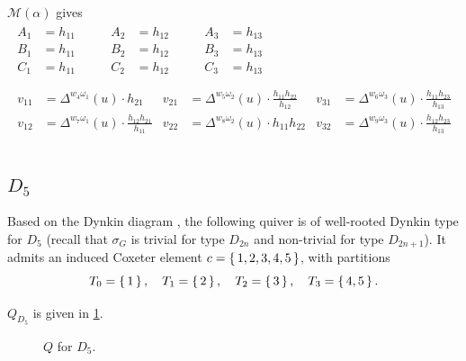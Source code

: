 \documentclass{amsart}
\theoremstyle{plain}
\theoremstyle{definition}
\theoremstyle{remark}
\newcommand{\conftoquiv}{\mathcal{M}}
\newcommand{\fundamentalweight}{\omega}
\newcommand{\genminor}[2]{\Delta^{{#1} \fundamentalweight_{#2}}}
\newcommand{\inldynkinDfive}{\raisebox{-0.7ex}{}}
\begin{document}
  $\conftoquiv(\alpha)$ gives
  \begin{equation*}
    \begin{gathered}
      \begin{aligned}
        A_1 &= h_{11} &\qquad A_2 &= h_{12} &\qquad A_3 &= h_{13} \\
        B_1 &= h_{11} &\qquad B_2 &= h_{12} &\qquad B_3 &= h_{13} \\
        C_1 &= h_{11} &\qquad C_2 &= h_{12} &\qquad C_3 &= h_{13} \\
      \end{aligned}
      \\
      \begin{aligned}
        v_{1 1} &= \genminor{w_{4}}{1}(u) \cdot h_{21} & v_{2 1} &= \genminor{w_{5}}{2}(u) \cdot \frac{h_{11} h_{22} }{h_{12}} & v_{3 1} &= \genminor{w_{6}}{3}(u) \cdot \frac{h_{11} h_{23} }{h_{13}} \\
        v_{1 2} &= \genminor{w_{7}}{1}(u) \cdot \frac{h_{12} h_{21} }{h_{11}} & v_{2 2} &= \genminor{w_{8}}{2}(u) \cdot h_{11} h_{22} & v_{3 2} &= \genminor{w_{9}}{3}(u) \cdot \frac{h_{12} h_{23} }{h_{13}} \\
      \end{aligned}
    \end{gathered}
  \end{equation*}

  \subsection{\texorpdfstring{$D_5$}{D\_5}}

  Based on the Dynkin diagram \inldynkinDfive, the following quiver is
  of well-rooted Dynkin type for $D_5$ (recall that $\sigma_G$ is
  trivial for type $D_{2n}$ and non-trivial for type $D_{2n+1}$). It
  admits an induced Coxeter element $c = \set{1, 2, 3, 4, 5}$, with
  partitions \[ T_0 = \set{1}, \quad T_1 = \set{2}, \quad T_2 = \set{3},
    \quad T_3 = \set{4, 5}. \]

  {\centering 

  } $Q_{D_5}$ is given in \cref{fig:QD5}.

  \begin{figure}
    \centering 

    \caption{$Q$ for $D_5$.
      \label{fig:QD5}
    }
  \end{figure}
\end{document}
